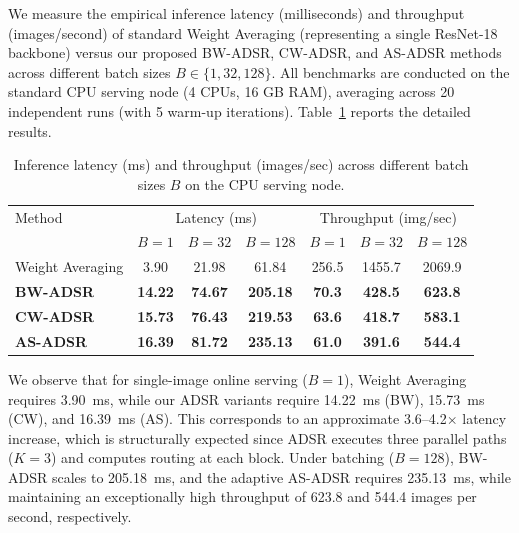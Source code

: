\documentclass{article}
\theoremstyle{plain}
\theoremstyle{definition}
\theoremstyle{remark}
\begin{document}
We measure the empirical inference latency (milliseconds) and throughput (images/second) of standard Weight Averaging (representing a single ResNet-18 backbone) versus our proposed BW-ADSR, CW-ADSR, and AS-ADSR methods across different batch sizes $B \in \{1, 32, 128\}$. All benchmarks are conducted on the standard CPU serving node (4 CPUs, 16 GB RAM), averaging across 20 independent runs (with 5 warm-up iterations). Table~\ref{tab:latency} reports the detailed results.

\begin{table}[t]
\caption{Inference latency (ms) and throughput (images/sec) across different batch sizes $B$ on the CPU serving node.}
\label{tab:latency}
\vskip 0.15in
\begin{center}
\begin{small}
\scshape
\setlength{\tabcolsep}{6.0pt}
\begin{tabular}{lcccccc}
\toprule
Method & \multicolumn{3}{c}{Latency (ms)} & \multicolumn{3}{c}{Throughput (img/sec)} \\
 & $B=1$ & $B=32$ & $B=128$ & $B=1$ & $B=32$ & $B=128$ \\
\midrule
Weight Averaging & 3.90 & 21.98 & 61.84 & 256.5 & 1455.7 & 2069.9 \\
\textbf{BW-ADSR} & \textbf{14.22} & \textbf{74.67} & \textbf{205.18} & \textbf{70.3} & \textbf{428.5} & \textbf{623.8} \\
\textbf{CW-ADSR} & \textbf{15.73} & \textbf{76.43} & \textbf{219.53} & \textbf{63.6} & \textbf{418.7} & \textbf{583.1} \\
\textbf{AS-ADSR} & \textbf{16.39} & \textbf{81.72} & \textbf{235.13} & \textbf{61.0} & \textbf{391.6} & \textbf{544.4} \\
\bottomrule
\end{tabular}
\end{small}
\end{center}
\vskip -0.1in
\end{table}

We observe that for single-image online serving ($B=1$), Weight Averaging requires 3.90~ms, while our ADSR variants require 14.22~ms (BW), 15.73~ms (CW), and 16.39~ms (AS). This corresponds to an approximate 3.6--4.2$\times$ latency increase, which is structurally expected since ADSR executes three parallel paths ($K=3$) and computes routing at each block. Under batching ($B=128$), BW-ADSR scales to 205.18~ms, and the adaptive AS-ADSR requires 235.13~ms, while maintaining an exceptionally high throughput of 623.8 and 544.4 images per second, respectively. 
\end{document}
